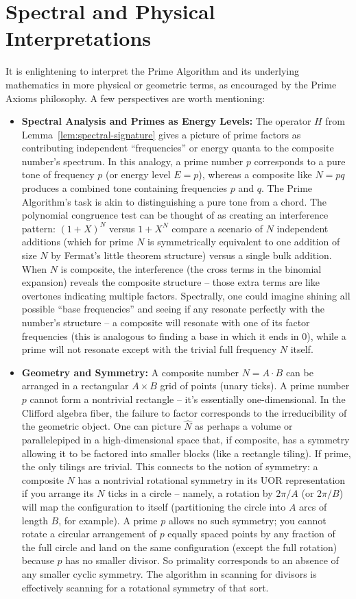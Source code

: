 \documentclass[11pt]{article}
\begin{document}
{\section{Spectral and Physical Interpretations}
It is enlightening to interpret the Prime Algorithm and its underlying mathematics in more physical or geometric terms, as encouraged by the Prime Axioms philosophy. A few perspectives are worth mentioning:
\begin{itemize}
    \item \textbf{Spectral Analysis and Primes as Energy Levels:} The operator $H$ from Lemma~\ref{lem:spectral-signature} gives a picture of prime factors as contributing independent “frequencies” or energy quanta to the composite number’s spectrum. In this analogy, a prime number $p$ corresponds to a pure tone of frequency $p$ (or energy level $E=p$), whereas a composite like $N=pq$ produces a combined tone containing frequencies $p$ and $q$. The Prime Algorithm’s task is akin to distinguishing a pure tone from a chord. The polynomial congruence test can be thought of as creating an interference pattern: $(1+X)^N$ versus $1+X^N$ compare a scenario of $N$ independent additions (which for prime $N$ is symmetrically equivalent to one addition of size $N$ by Fermat’s little theorem structure) versus a single bulk addition. When $N$ is composite, the interference (the cross terms in the binomial expansion) reveals the composite structure – those extra terms are like overtones indicating multiple factors. Spectrally, one could imagine shining all possible “base frequencies” and seeing if any resonate perfectly with the number’s structure – a composite will resonate with one of its factor frequencies (this is analogous to finding a base in which it ends in 0), while a prime will not resonate except with the trivial full frequency $N$ itself.
    \item \textbf{Geometry and Symmetry:} A composite number $N = A\cdot B$ can be arranged in a rectangular $A \times B$ grid of points (unary ticks). A prime number $p$ cannot form a nontrivial rectangle – it’s essentially one-dimensional. In the Clifford algebra fiber, the failure to factor corresponds to the irreducibility of the geometric object. One can picture $\hat{N}$ as perhaps a volume or parallelepiped in a high-dimensional space that, if composite, has a symmetry allowing it to be factored into smaller blocks (like a rectangle tiling). If prime, the only tilings are trivial. This connects to the notion of symmetry: a composite $N$ has a nontrivial rotational symmetry in its UOR representation if you arrange its $N$ ticks in a circle – namely, a rotation by $2\pi/A$ (or $2\pi/B$) will map the configuration to itself (partitioning the circle into $A$ arcs of length $B$, for example). A prime $p$ allows no such symmetry; you cannot rotate a circular arrangement of $p$ equally spaced points by any fraction of the full circle and land on the same configuration (except the full rotation) because $p$ has no smaller divisor. So primality corresponds to an absence of any smaller cyclic symmetry. The algorithm in scanning for divisors is effectively scanning for a rotational symmetry of that sort.

\end{itemize}}
\end{document}
